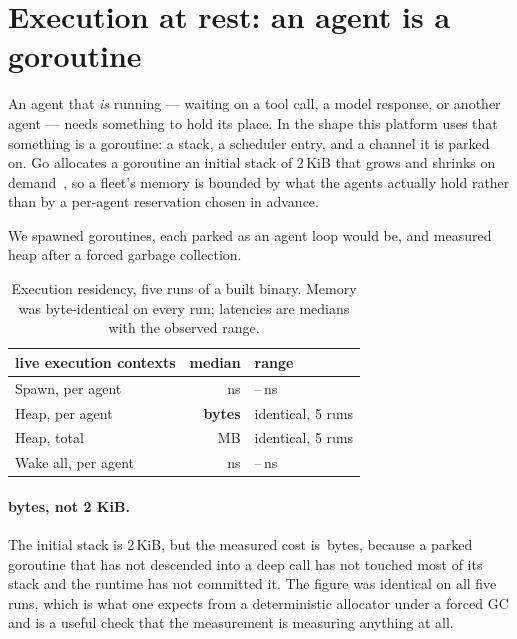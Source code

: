 \section{Execution at rest: an agent is a goroutine}
\label{sec:execution}

An agent that \emph{is} running --- waiting on a tool call, a model response, or
another agent --- needs something to hold its place. In the shape this platform
uses that something is a goroutine: a stack, a scheduler entry, and a channel it
is parked on. Go allocates a goroutine an initial stack of 2\,KiB that grows and
shrinks on demand~\cite{gostack}, so a fleet's memory is bounded by what the
agents actually hold rather than by a per-agent reservation chosen in advance.

We spawned \rFleetAgents{} goroutines, each parked as an agent loop would be,
and measured heap after a forced garbage collection.

\begin{table}[h]
\centering
\begin{tabular}{lrl}
\toprule
\textbf{\rFleetAgents{} live execution contexts} & \textbf{median} & \textbf{range} \\
\midrule
Spawn, per agent          & \rGoSpawn{}\,ns  & \rGoSpawnLo{}--\rGoSpawnHi{}\,ns \meas{} \\
Heap, per agent           & \textbf{\rGoPer{}\,bytes} & identical, 5 runs \meas{} \\
Heap, total               & \rGoHeap{}\,MB   & identical, 5 runs \meas{} \\
Wake all, per agent       & \rGoWake{}\,ns   & \rGoWakeLo{}--\rGoWakeHi{}\,ns \meas{} \\
\bottomrule
\end{tabular}
\caption{Execution residency, five runs of a built binary. Memory was
byte-identical on every run; latencies are medians with the observed range.}
\label{tab:goroutine}
\end{table}

\paragraph{\rGoPer{} bytes, not 2 KiB.}
The initial stack is 2\,KiB, but the measured cost is \rGoPer{}\,bytes, because
a parked goroutine that has not descended into a deep call has not touched most
of its stack and the runtime has not committed it. The figure was identical on
all five runs, which is what one expects from a deterministic allocator under a
forced GC and is a useful check that the measurement is measuring anything at
all.

